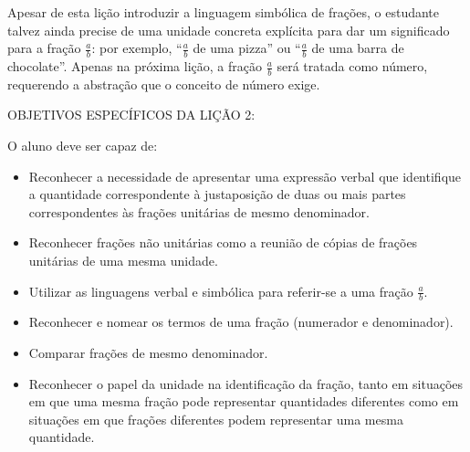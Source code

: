 Apesar de esta lição introduzir a linguagem simbólica de frações, o estudante talvez ainda precise de uma unidade concreta explícita para dar um significado para a fração $\frac{a}{b}$: por exemplo, ``$\frac{a}{b}$ de uma pizza'' ou ``$\frac{a}{b}$ de uma barra de chocolate''. Apenas na próxima lição, a fração $\frac{a}{b}$ será tratada como número, requerendo a abstração que o conceito de número exige.
\vspace{.15cm}

\noindent OBJETIVOS ESPECÍFICOS DA LIÇÃO 2:
\vspace{.15cm}

\noindent O aluno deve ser capaz de:
\begin{itemize}
 \item  Reconhecer a necessidade de apresentar uma expressão verbal que identifique a quantidade correspondente à justaposição de duas ou mais partes correspondentes às frações unitárias de mesmo denominador.
 \item  Reconhecer frações não unitárias como a reunião de cópias de frações unitárias de uma mesma unidade. 
 \item  Utilizar as linguagens verbal e simbólica para referir-se a uma fração $\frac{a}{b}$.
 \item  Reconhecer e nomear os termos de uma fração (numerador e denominador). 
 \item  Comparar frações de mesmo denominador.
 \item Reconhecer o papel da unidade na identificação da fração, tanto em situações em  que uma mesma fração pode representar quantidades diferentes como em situações em que frações diferentes podem representar uma mesma quantidade.
\end{itemize}


\pagebreak

